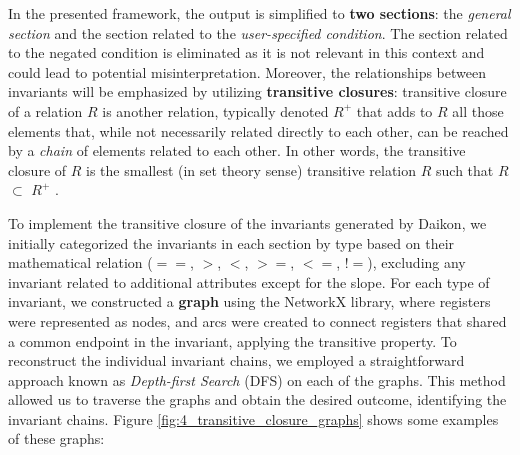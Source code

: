 In the presented framework, the output is simplified to \textbf{two sections}: the \textit{general section} and the section related to the \textit{user-specified condition}. The section related to the negated condition is eliminated as it is not relevant in this context and could lead to potential misinterpretation. Moreover, the relationships between invariants will be emphasized by utilizing \textbf{transitive closures}: transitive closure of a relation $R$ is another relation, typically denoted $R^{+}$ that adds to $R$ all those elements that, while not necessarily related directly to each other, can be reached by a \textit{chain} of elements related to each other. In other words, the transitive closure of $R$ is the smallest (in set theory sense) transitive relation $R$ such that $R$ $\subset$ $R^{+}$ \cite{transitive_closures}. 

\bigskip
To implement the transitive closure of the invariants generated by Daikon, we initially categorized the invariants in each section by type based on their mathematical relation ($==$, $>$, $<$, $>=$, $<=$, $!=$), excluding any invariant related to additional attributes except for the slope. For each type of invariant, we constructed a \textbf{graph} using the NetworkX library, where registers were represented as nodes, and arcs were created to connect registers that shared a common endpoint in the invariant, applying the transitive property. To reconstruct the individual invariant chains, we employed a straightforward approach known as \textit{Depth-first Search} (DFS) on each of the graphs. This method allowed us to traverse the graphs and obtain the desired outcome, identifying the invariant chains. Figure \ref{fig:4_transitive_closure_graphs} shows some examples of these graphs:

